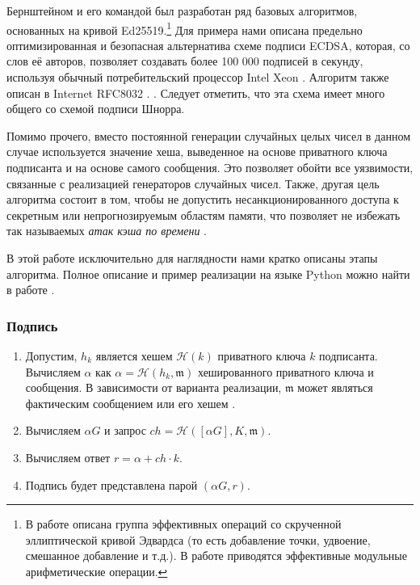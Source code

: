 Бернштейном и его командой был разработан ряд базовых алгоритмов, основанных на кривой Ed25519.\footnote{\label{group_ops_twisted_edwards_note}В работе \cite{Bernstein2007} описана группа эффективных операций со скрученной эллиптической кривой Эдвардса (то есть добавление точки, удвоение, смешанное добавление и т.д.). В работе \cite{curve25519} приводятся эффективные модульные арифметические операции.}
Для примера нами описана предельно оптимизированная и безопасная альтернати\-ва схеме подписи ECDSA, которая, со слов её авторов, позволяет создавать более 100 000 подписей в секунду, используя обычный потребительский процессор Intel Xeon \cite{Bernstein2012}. Алгоритм также описан в Internet RFC8032 \cite{rfc8032}. . Следует отметить, что эта схема имеет много общего со схемой подписи Шнорра.

Помимо прочего, вместо постоянной генерации случайных целых чисел в данном случае используется значение хеша, выведенное на основе приватного ключа подписанта и на основе самого сообщения. Это позволяет обойти все уязвимости, связанные с реализацией генерато\-ров случайных чисел. Также, другая цель алгоритма состоит в том, чтобы не допустить несанкционированного доступа к секретным или непрогнозируемым областям памяти, что позволяет не избежать так называемых {\em атак кэша по времени} \cite{Bernstein2012}.

В этой работе исключительно для наглядности нами кратко описаны этапы алгоритма. Пол\-ное описание и пример реализации на языке Python можно найти в работе \cite{rfc8032}. 

\subsubsection*{Подпись}

\begin{enumerate}
	\item Допустим, \(h_k\) является хешем \(\mathcal{H}(k)\) приватного ключа \(k\) подписанта. 
	Вычисляем \(\alpha\) как \(\alpha = \mathcal{H}(h_k, \mathfrak{m})\) хешированного приватного ключа и сообщения. В зависимости от варианта реализации, $\mathfrak{m}$ может являться фактическим сообщением или его хешем \cite{rfc8032}.
	
	\item Вычисляем \(\alpha G\) и запрос $ch = \mathcal{H}([\alpha G], K,  \mathfrak{m})$.

	\item Вычисляем ответ \(r = \alpha + ch \cdot k \).
	
	\item Подпись будет представлена парой \((\alpha G, r)\).
\end{enumerate}

